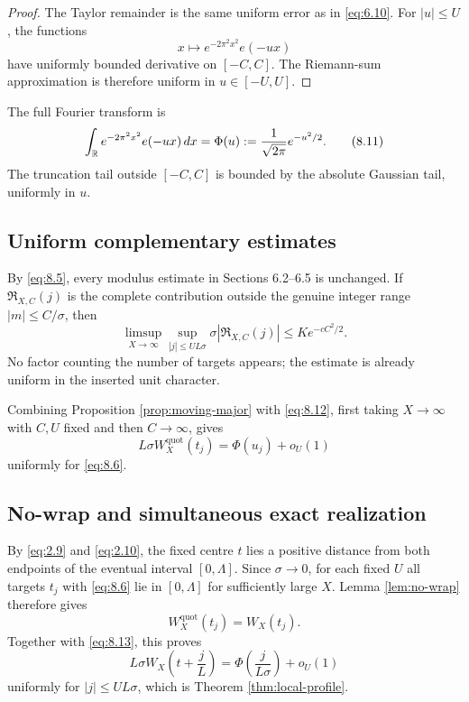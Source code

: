 \begin{proof}
The Taylor remainder is the same uniform error as in \eqref{eq:6.10}. For $|u|\le U$, the functions
\[
x\mapsto e^{-2\pi^2x^2}e(-ux)
\]
have uniformly bounded derivative on $[-C,C]$. The Riemann-sum approximation is therefore uniform in $u\in[-U,U]$.
\end{proof}

The full Fourier transform is
\[
\int_{\mathbb R}e^{-2\pi^2x^2}e(-ux)\,dx
=
\Phi(u)
:=
\frac1{\sqrt{2\pi}}e^{-u^2/2}.
\tag{8.11}\label{eq:8.11}
\]
The truncation tail outside $[-C,C]$ is bounded by the absolute Gaussian tail, uniformly in $u$.

\subsection{Uniform complementary estimates}

By \eqref{eq:8.5}, every modulus estimate in Sections 6.2--6.5 is unchanged. If $\mathfrak R_{X,C}(j)$ is the complete contribution outside the genuine integer range $|m|\le C/\sigma$, then
\[
\limsup_{X\to\infty}
\sup_{|j|\le UL\sigma}
\sigma|\mathfrak R_{X,C}(j)|
\le
K e^{-cC^2/2}.
\tag{8.12}\label{eq:8.12}
\]
No factor counting the number of targets appears; the estimate is already uniform in the inserted unit character.

Combining Proposition \ref{prop:moving-major} with \eqref{eq:8.12}, first taking $X\to\infty$ with $C,U$ fixed and then $C\to\infty$, gives
\[
L\sigma W_X^{\mathrm{quot}}(t_j)
=
\Phi(u_j)+o_U(1)
\tag{8.13}\label{eq:8.13}
\]
uniformly for \eqref{eq:8.6}.

\subsection{No-wrap and simultaneous exact realization}

By \eqref{eq:2.9} and \eqref{eq:2.10}, the fixed centre $t$ lies a positive distance from both endpoints of the eventual interval $[0,\Lambda]$. Since $\sigma\to0$, for each fixed $U$ all targets $t_j$ with \eqref{eq:8.6} lie in $[0,\Lambda]$ for sufficiently large $X$. Lemma \ref{lem:no-wrap} therefore gives
\[
W_X^{\mathrm{quot}}(t_j)=W_X(t_j).
\tag{8.14}\label{eq:8.14}
\]
Together with \eqref{eq:8.13}, this proves
\[
L\sigma
W_X\!\left(t+\frac{j}{L}\right)
=
\Phi\!\left(\frac{j}{L\sigma}\right)+o_U(1)
\tag{8.15}\label{eq:moving-profile}
\]
uniformly for $|j|\le UL\sigma$, which is Theorem \ref{thm:local-profile}.

